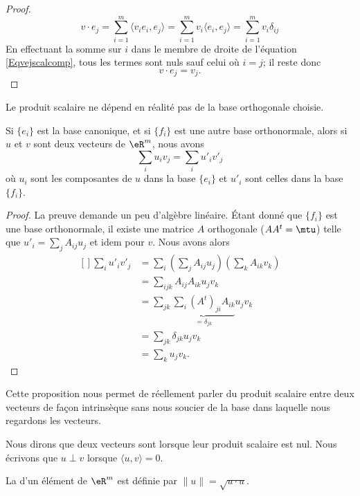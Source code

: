 \begin{proof}
	\begin{equation}		\label{Eqvejscalcomp}
		v\cdot e_j=\sum_{i=1}^m\langle v_ie_i, e_j\rangle =\sum_{i=1}^mv_i\langle e_i, e_j\rangle =\sum_{i=1}^mv_i\delta_{ij}
	\end{equation}
	En effectuant la somme sur $i$ dans le membre de droite de l'équation \eqref{Eqvejscalcomp}, tous les termes sont nuls sauf celui où $i=j$; il reste donc
	\begin{equation}
		v\cdot e_j=v_j.
	\end{equation}
\end{proof}

Le produit scalaire ne dépend en réalité pas de la base orthogonale choisie.

\begin{lemma}
	Si $\{ e_i \}$ est la base canonique, et si $\{ f_i \}$ est une autre base orthonormale, alors si $u$ et $v$ sont deux vecteurs de $\eR^m$, nous avons
	\begin{equation}
		\sum_i u_iv_j=\sum_iu'_iv'_j
	\end{equation}
	où $u_i$ sont les composantes de $u$ dans la base $\{ e_i \}$ et $u'_i$ sont celles dans la base $\{ f_i \}$.
\end{lemma}

\begin{proof}
	La preuve demande un peu d'algèbre linéaire. Étant donné que $\{ f_i \}$ est une base orthonormale, il existe une matrice $A$ orthogonale ($AA^t=\mtu$) telle que $u'_i=\sum_jA_{ij}u_j$ et idem pour $v$. Nous avons alors
	\begin{equation}
		\begin{aligned}[]
			\sum_iu'_iv'_j&=\sum_i\left( \sum_jA_{ij} u_j\right)\left( \sum_k A_{ik}v_k \right)\\
			&=\sum_{ijk}A_{ij}A_{ik}u_jv_k\\
			&=\sum_{jk}\underbrace{\sum_i(A^t)_{ji}A_{ik}}_{=\delta_{jk}}u_jv_k\\
			&=\sum_{jk}\delta_{jk}u_jv_k\\
			&=\sum_ku_jv_k.
		\end{aligned}
	\end{equation}
\end{proof}

Cette proposition nous permet de réellement parler du produit scalaire entre deux vecteurs de façon intrinsèque sans nous soucier de la base dans laquelle nous regardons les vecteurs.

Nous dirons que deux vecteurs sont  lorsque leur produit scalaire est nul. Nous écrivons que $u\perp v$ lorsque $\langle u, v\rangle =0$.
\begin{definition}	\label{DefNormeEucleApp}
	La  d'un élément de $\eR^m$ est définie par $\| u \|=\sqrt{u\cdot u}$.
\end{definition}

